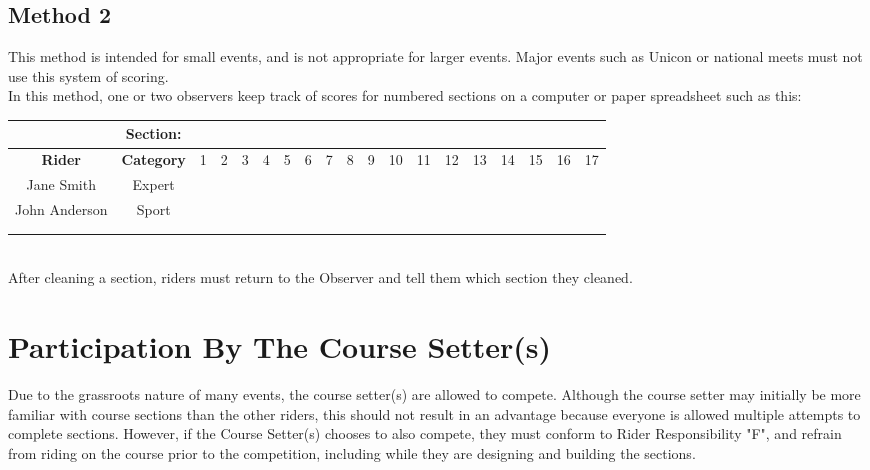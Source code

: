 \subsection{Method 2} 
This method is intended for small events, and is not appropriate for larger events. Major events such as Unicon or
national meets must not use this system of scoring.\\
In this method, one or two observers keep track of scores for numbered sections on a computer or paper spreadsheet
such as this:\\
\begin{tabular}{|c|c|c|c|c|c|c|c|c|c|c|c|c|c|c|c|c|c|c|}
\hline 
 & \textbf{Section:} & & &  & &  &  &  &  &  & & & &  &  &  &  &  \\ 
\hline 
\textbf{Rider} & \textbf{Category} & 1 & 2 & 3 & 4 & 5 & 6 & 7 & 8 & 9 & 10 & 11 & 12 & 13 & 14 & 15 & 16 & 17 \\ 
\hline 
Jane Smith & Expert &  &  &  &  &  &  &  & &  &  &  & &  &  & &  &  \\ 
\hline 
John Anderson & Sport &  &  & &  &  &  &  & &  &  &  &  &  &  &  &  & \\ 
\hline 
 & &  & & &  &  &  &  &  & & &  & &  & &  & &  \\ 
\hline 
 & &  & & &  &  &  &  &  & & &  & &  & &  & &  \\ 
\hline 
\end{tabular} \\
After cleaning a section, riders must return to the Observer and tell them which section they cleaned.

\section{Participation By The Course Setter(s)}
Due to the grassroots nature of many events, the course setter(s) are allowed to compete. Although the course setter may
initially be more familiar with course sections than the other riders, this should not result in an advantage because
everyone is allowed multiple attempts to complete sections. However, if the Course Setter(s) chooses to also compete, they
must conform to Rider Responsibility "F", and refrain from riding on the course prior to the competition, including while
they are designing and building the sections.

